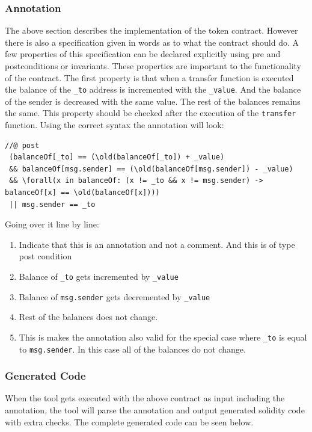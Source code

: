 \documentclass[a4paper]{article}
\begin{document}
\subsubsection{Annotation}
The above section describes the implementation of the token contract. However there is also a specification given in words as to what the contract should do. A few properties of this specification can be declared explicitly using pre and postconditions or invariants. These properties are important to the functionality of the contract. 
The first property is that when a transfer function is executed the balance of the \texttt{\_to} address is incremented with the \texttt{\_value}. And the balance of the sender is decreased with the same value. The rest of the balances remains the same. This property should be checked after the execution of the \texttt{transfer} function. Using the correct syntax the annotation will look:
\begin{lstlisting}[basicstyle=\ttfamily, breaklines=true ]
//@ post 
 (balanceOf[_to] == (\old(balanceOf[_to]) + _value) 
 && balanceOf[msg.sender] == (\old(balanceOf[msg.sender]) - _value) 
 && \forall(x in balanceOf: (x != _to && x != msg.sender) -> balanceOf[x] == \old(balanceOf[x]))) 
 || msg.sender == _to 
\end{lstlisting}
Going over it line by line:
\begin{enumerate}
  \item Indicate that this is an annotation and not a comment. And this is of type post condition
  \item Balance of \texttt{\_to} gets incremented by \texttt{\_value}
  \item Balance of \texttt{msg.sender} gets decremented by \texttt{\_value}
  \item Rest of the balances does not change.
  \item This is makes the annotation also valid for the special case where \texttt{\_to} is equal to \texttt{msg.sender}. In this case all of the balances do not change.
\end{enumerate}

\subsubsection{Generated Code}
When the tool gets executed with the above contract as input including the annotation, the tool will parse the annotation and output generated solidity code with extra checks. 
The complete generated code can be seen below.

\end{document}
